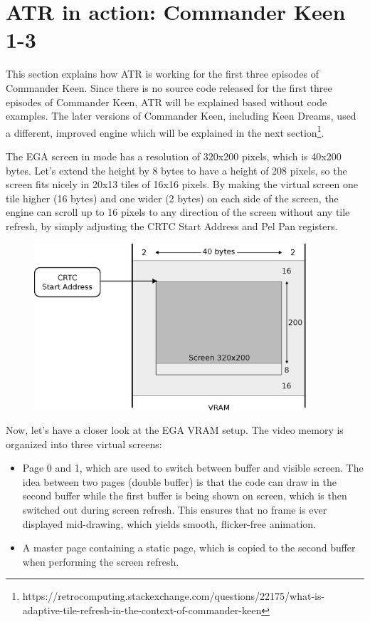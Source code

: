\documentclass[book.tex]{subfiles}
\begin{document}
\section{ATR in action: Commander Keen 1-3}
This section explains how ATR is working for the first three episodes of Commander Keen. Since there is no source code released for the first three episodes of Commander Keen, ATR will be explained based without code examples. The later versions of Commander Keen, including Keen Dreams, used a different, improved engine which will be explained in the next section\footnote{https://retrocomputing.stackexchange.com/questions/22175/what-is-adaptive-tile-refresh-in-the-context-of-commander-keen}.\\

\par
The EGA screen in mode  has a resolution of 320x200 pixels, which is 40x200 bytes. Let's extend the height by 8 bytes to have a height of 208 pixels, so the screen fits nicely in 20x13 tiles of 16x16 pixels. By making the virtual screen one tile higher (16 bytes) and one wider (2 bytes) on each side of the screen, the engine can scroll up to 16 pixels to any direction of the screen without any tile refresh, by simply adjusting the CRTC Start Address and Pel Pan registers.\\

\begin{figure}[H]
\centering
\includegraphics[width=0.9\textwidth]{imgs/drawings/ATR_virtual_screen.eps}
\label{fig:atr_virtual screen}
\end{figure}


Now, let's have a closer look at the EGA VRAM setup. The video memory is organized into three virtual screens:
\begin{itemize}
\item Page 0 and 1, which are used to switch between buffer and visible screen. The idea between two pages (double buffer) is that the code can draw in the second buffer while the first buffer is being shown on screen, which is then switched out during screen refresh. This ensures that no frame is ever displayed mid-drawing, which yields smooth, flicker-free animation.
\item A master page containing a static page, which is copied to the second buffer when performing the screen refresh.
\end{itemize}
\end{document}

